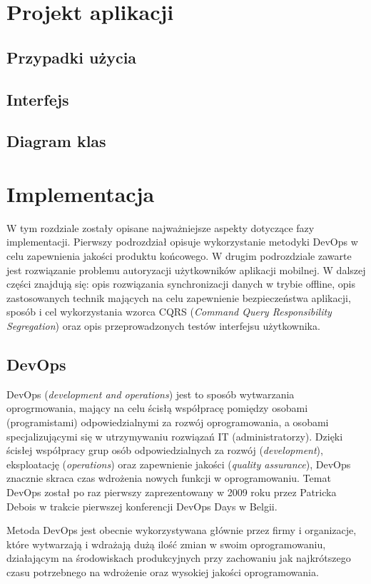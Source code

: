 \chapter{Projekt aplikacji}
\section{Przypadki użycia}
\section{Interfejs}
\section{Diagram klas}
\chapter{Implementacja}
W tym rozdziale zostały opisane najważniejsze aspekty dotyczące fazy implementacji. Pierwszy podrozdział opisuje wykorzystanie metodyki DevOps w celu zapewnienia jakości produktu końcowego. W drugim podrozdziale zawarte jest rozwiązanie problemu autoryzacji użytkowników aplikacji mobilnej. W dalszej części znajdują się: opis rozwiązania synchronizacji danych w trybie offline, opis zastosowanych technik mających na celu zapewnienie bezpieczeństwa aplikacji, sposób i cel wykorzystania wzorca CQRS (\textit{Command Query Responsibility Segregation}) oraz opis przeprowadzonych testów interfejsu użytkownika.
\section{DevOps}
DevOps (\textit{development and operations}) jest to sposób wytwarzania oprogrmowania, mający na celu ścisłą współpracę pomiędzy osobami (programistami) odpowiedzialnymi za rozwój oprogramowania, a osobami specjalizującymi się w utrzymywaniu rozwiązań IT (administratorzy). Dzięki ścisłej współpracy grup osób odpowiedzialnych za rozwój (\textit{development}), eksploatację (\textit{operations}) oraz zapewnienie jakości (\textit{quality assurance}), DevOps znacznie skraca czas wdrożenia nowych funkcji w oprogramowaniu. Temat DevOps został po raz pierwszy zaprezentowany w 2009 roku przez Patricka Debois w trakcie pierwszej konferencji DevOps Days w Belgii. \cite{RefWorks:2}\cite{Czymjest19:online}

Metoda DevOps jest obecnie wykorzystywana głównie przez firmy i organizacje, które wytwarzają i wdrażają dużą ilość zmian w swoim oprogramowaniu, działającym na środowiskach produkcyjnych przy zachowaniu jak najkrótszego czasu potrzebnego na wdrożenie oraz wysokiej jakości oprogramowania. \cite{Devopsco42:online}

